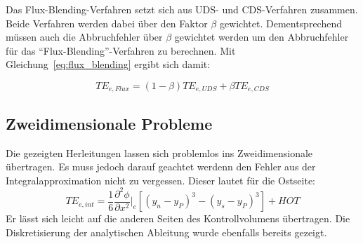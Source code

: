 Das Flux-Blending-Verfahren setzt sich aus UDS- und CDS-Verfahren zusammen. Beide
Verfahren werden dabei über den Faktor $\beta$ gewichtet. Dementsprechend müssen auch die
Abbruchfehler über $\beta$ gewichtet werden um den Abbruchfehler für das ``Flux-Blending''-Verfahren zu berechnen.
Mit Gleichung~\ref{eq:flux_blending} ergibt sich damit:

\begin{equation}
  TE_{e, Flux} = (1-\beta) TE_{e, UDS} + \beta TE_{e, CDS}
\end{equation}







\subsection{Zweidimensionale Probleme}
Die gezeigten Herleitungen lassen sich problemlos ins Zweidimensionale übertragen. Es muss
jedoch darauf geachtet werdenn den Fehler aus der Integralapproximation nicht zu vergessen.
Dieser lautet für die Ostseite:
\begin{equation}
  TE_{e,int} = \frac{1}{6} \frac{\partial^2\phi}{\partial x^2}\bigg\vert_e
    \left[{{(y_n-y_P)}^3-{(y_s-y_P)}^3}\right] + HOT
\end{equation}
Er lässt sich leicht auf die anderen Seiten des Kontrollvolumens übertragen. Die Diskretisierung
der analytischen Ableitung wurde ebenfalls bereits gezeigt.
\clearpage
